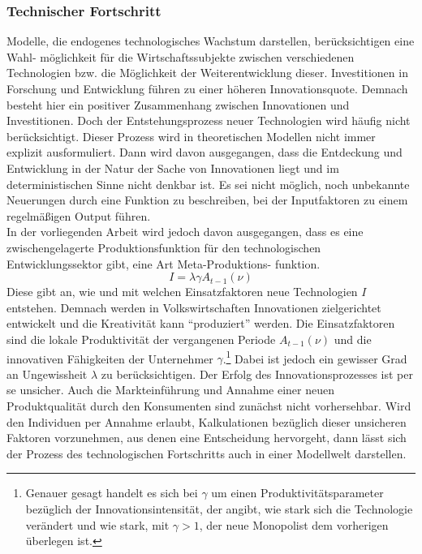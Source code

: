 \subsubsection{Technischer Fortschritt}
Modelle, die endogenes technologisches Wachstum darstellen, berücksichtigen eine Wahl- möglichkeit für die Wirtschaftssubjekte zwischen verschiedenen Technologien bzw. die Möglichkeit der Weiterentwicklung dieser. Investitionen in Forschung und Entwicklung führen zu einer höheren Innovationsquote. Demnach besteht hier ein positiver Zusammenhang zwischen Innovationen und Investitionen. Doch der Entstehungsprozess neuer Technologien wird häufig nicht berücksichtigt. Dieser Prozess wird in theoretischen Modellen nicht immer explizit ausformuliert. Dann wird davon ausgegangen, dass die Entdeckung und Entwicklung in der Natur der Sache von Innovationen liegt und im deterministischen Sinne nicht denkbar ist. Es sei nicht möglich, noch unbekannte Neuerungen durch eine Funktion zu beschreiben, bei der Inputfaktoren zu einem regelmäßigen Output führen.\\
%
In der vorliegenden Arbeit wird jedoch davon ausgegangen, dass es eine zwischengelagerte Produktionsfunktion für den technologischen Entwicklungssektor gibt, eine Art Meta-Produktions- funktion.
%
	\begin{equation}
		I=\lambda\gamma A_{t-1}(\nu)
	\end{equation}\label{Meta}
%
Diese gibt an, wie und mit welchen Einsatzfaktoren neue Technologien $I$ entstehen. Demnach werden in Volkswirtschaften Innovationen zielgerichtet entwickelt und die Kreativität kann "`produziert"' werden. Die Einsatzfaktoren sind die lokale Produktivität der vergangenen Periode $A_{t-1}(\nu)$ und die innovativen Fähigkeiten der Unternehmer $\gamma$.\footnote{Genauer gesagt handelt es sich bei $\gamma$ um einen Produktivitätsparameter bezüglich der Innovationsintensität, der angibt, wie stark sich die Technologie verändert und wie stark, mit $\gamma>1$, der neue Monopolist dem vorherigen überlegen ist.} Dabei ist jedoch ein gewisser Grad an Ungewissheit $\lambda$ zu berücksichtigen. Der Erfolg des Innovationsprozesses ist per se unsicher. Auch die Markteinführung und Annahme einer neuen Produktqualität durch den Konsumenten sind zunächst nicht vorhersehbar. Wird den Individuen per Annahme erlaubt, Kalkulationen bezüglich dieser unsicheren Faktoren vorzunehmen, aus denen eine Entscheidung hervorgeht, dann lässt sich der Prozess des technologischen Fortschritts auch in einer Modellwelt darstellen.\\
